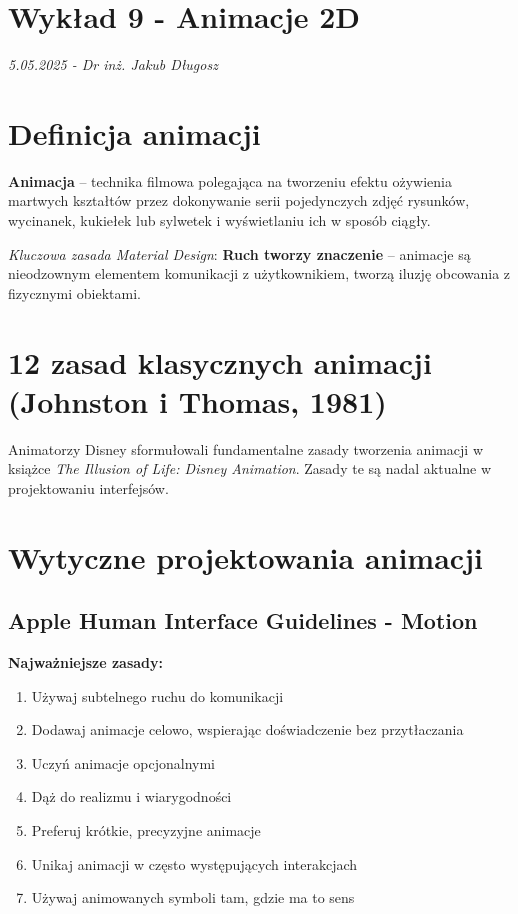 \section*{Wykład 9 - Animacje 2D}
\textit{5.05.2025 - Dr inż. Jakub Długosz}

\section{Definicja animacji}
\textbf{Animacja} -- technika filmowa polegająca na tworzeniu efektu ożywienia martwych kształtów przez dokonywanie serii pojedynczych zdjęć rysunków, wycinanek, kukiełek lub sylwetek i wyświetlaniu ich w sposób ciągły.

\textit{Kluczowa zasada Material Design}: \textbf{Ruch tworzy znaczenie} -- animacje są nieodzownym elementem komunikacji z użytkownikiem, tworzą iluzję obcowania z fizycznymi obiektami.

\section{12 zasad klasycznych animacji (Johnston i Thomas, 1981)}
Animatorzy Disney sformułowali fundamentalne zasady tworzenia animacji w książce \textit{The Illusion of Life: Disney Animation}. Zasady te są nadal aktualne w projektowaniu interfejsów.

\section{Wytyczne projektowania animacji}

\subsection{Apple Human Interface Guidelines - Motion}
\textbf{Najważniejsze zasady:}
\begin{enumerate}[itemsep=0pt]
    \item Używaj subtelnego ruchu do komunikacji
    \item Dodawaj animacje celowo, wspierając doświadczenie bez przytłaczania
    \item Uczyń animacje opcjonalnymi
    \item Dąż do realizmu i wiarygodności
    \item Preferuj krótkie, precyzyjne animacje
    \item Unikaj animacji w często występujących interakcjach
    \item Używaj animowanych symboli tam, gdzie ma to sens
\end{enumerate}

